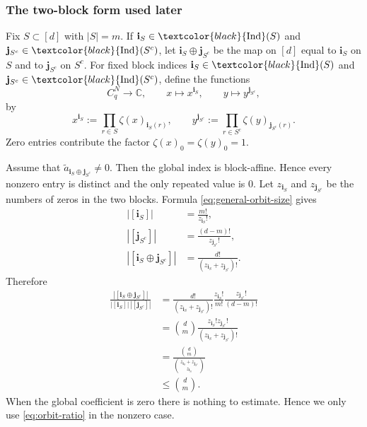 \documentclass[11pt,a4paper]{article}
\numberwithin{equation}{section}
\theoremstyle{cleanplain}
\theoremstyle{cleandefinition}
\theoremstyle{cleanremark}
\newcommand{\C}{\mathbb C}
\newcommand{\Ind}{\textcolor{black}{\operatorname{Ind}}}
\begin{document}
{\subsubsection{The two-block form used later}

Fix $S\subset[d]$ with $|S|=m$.  If
$\mathbf i_S\in\Ind(S)$ and
$\mathbf j_{S^c}\in\Ind(S^c)$, let
$\mathbf i_S\oplus\mathbf j_{S^c}$ be the map on $[d]$ equal to $\mathbf i_S$ on
$S$ and to $\mathbf j_{S^c}$ on $S^c$.  For fixed block indices $\mathbf i_S\in\Ind(S)$ and
$\mathbf j_{S^c}\in\Ind(S^c)$, define the functions
\[
 C_q^N\longrightarrow\C,
 \qquad
 x\longmapsto x^{\mathbf i_S},
 \qquad
 y\longmapsto y^{\mathbf j_{S^c}},
\]
by
\begin{equation}\label{eq:xu-yv}
 x^{\mathbf i_S}:=\prod_{r\in S}\zeta(x)_{\mathbf i_S(r)},
 \qquad
 y^{\mathbf j_{S^c}}:=\prod_{r\in S^c}\zeta(y)_{\mathbf j_{S^c}(r)}.
\end{equation}
Zero entries contribute the factor $\zeta(x)_0=\zeta(y)_0=1$.

Assume that $\widetilde a_{\mathbf i_S\oplus\mathbf j_{S^c}}\neq0$.  Then the global
index is block-affine.  {Hence every nonzero entry is distinct} and
the only repeated value is $0$.  Let $z_{\mathbf i_S}$ and
$z_{\mathbf j_{S^c}}$ be the numbers of zeros in the two blocks.  Formula
\eqref{eq:general-orbit-size} gives
\begin{align}
 |[\mathbf i_S]|&=\frac{m!}{z_{\mathbf i_S}!},\label{eq:orbit-u}\\
 |[\mathbf j_{S^c}]|&=\frac{(d-m)!}{z_{\mathbf j_{S^c}}!},\label{eq:orbit-v}\\
 |[\mathbf i_S\oplus\mathbf j_{S^c}]|
 &=\frac{d!}{(z_{\mathbf i_S}+z_{\mathbf j_{S^c}})!}.
 \label{eq:orbit-uv}
\end{align}
Therefore
\begin{align}
 \frac{|[\mathbf i_S\oplus\mathbf j_{S^c}]|}
 {|[\mathbf i_S]|\,|[\mathbf j_{S^c}]|}
 &=\frac{d!}{(z_{\mathbf i_S}+z_{\mathbf j_{S^c}})!}
   \frac{z_{\mathbf i_S}!}{m!}
   \frac{z_{\mathbf j_{S^c}}!}{(d-m)!}\\
 &=\binom dm
   \frac{z_{\mathbf i_S}!z_{\mathbf j_{S^c}}!}
        {(z_{\mathbf i_S}+z_{\mathbf j_{S^c}})!}\\
 &=\frac{\binom dm}
        {\binom{z_{\mathbf i_S}+z_{\mathbf j_{S^c}}}{z_{\mathbf i_S}}}\\
 &\leq\binom dm.
 \label{eq:orbit-ratio}
\end{align}
When the global coefficient is zero there is nothing to estimate.  Hence we
only use \eqref{eq:orbit-ratio} in the nonzero case.

}
\end{document}
